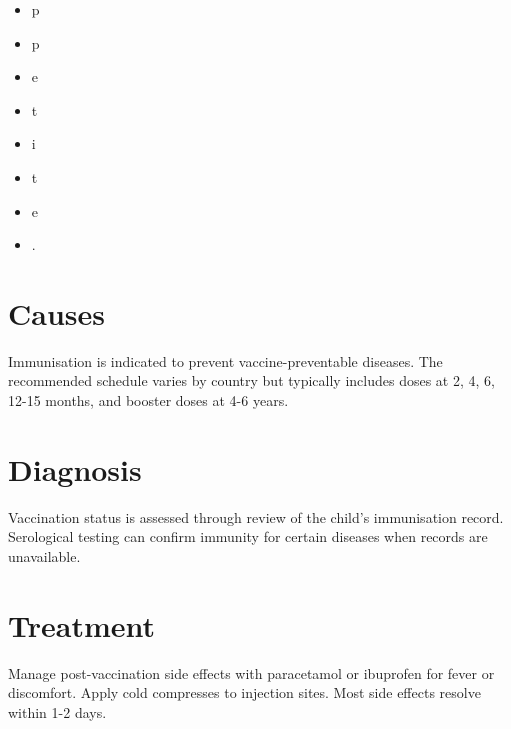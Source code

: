 \begin{itemize}
  \item p
\end{itemize}

\begin{itemize}
  \item p
\end{itemize}

\begin{itemize}
  \item e
\end{itemize}

\begin{itemize}
  \item t
\end{itemize}

\begin{itemize}
  \item i
\end{itemize}

\begin{itemize}
  \item t
\end{itemize}

\begin{itemize}
  \item e
\end{itemize}

\begin{itemize}
  \item .
\end{itemize}

\section*{Causes}
Immunisation is indicated to prevent vaccine-preventable diseases. The recommended schedule varies by country but typically includes doses at 2, 4, 6, 12-15 months, and booster doses at 4-6 years.

\section*{Diagnosis}
Vaccination status is assessed through review of the child's immunisation record. Serological testing can confirm immunity for certain diseases when records are unavailable.

\section*{Treatment}
Manage post-vaccination side effects with paracetamol or ibuprofen for fever or discomfort. Apply cold compresses to injection sites. Most side effects resolve within 1-2 days.

